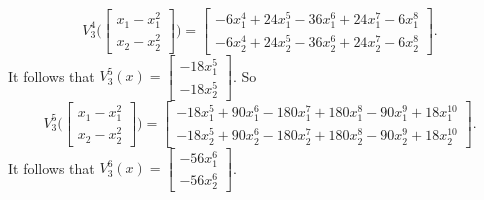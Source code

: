 \documentclass{article}
\begin{document}
\[
V_3^4\Big( \begin{bmatrix}x_1-x_1^2\\x_2-x_2^2\end{bmatrix}\Big)=
\begin{bmatrix}
-6x_1^4+24x_1^5-36x_1^6+24x_1^7-6x_1^8\\
-6x_2^4+24x_2^5-36x_2^6+24x_2^7-6x_2^8
\end{bmatrix}.
\]
It follows that $V_3^5(x)=\begin{bmatrix}-18x_1^5\\-18x_2^5\end{bmatrix}$. So
\[
V_3^5\Big( \begin{bmatrix}x_1-x_1^2\\x_2-x_2^2\end{bmatrix}\Big)=
\begin{bmatrix}
-18x_1^5+90x_1^6-180x_1^7+180x_1^8-90x_1^9+18x_1^{10}\\
-18x_2^5+90x_2^6-180x_2^7+180x_2^8-90x_2^9+18x_2^{10}
\end{bmatrix}.
\]
It follows that $V_3^6(x)=\begin{bmatrix}-56x_1^6\\-56x_2^6\end{bmatrix}$.
\end{document}
